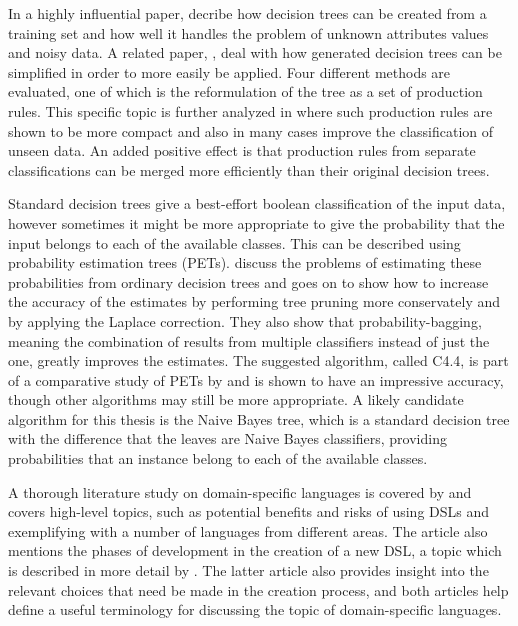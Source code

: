 \documentclass[10pt,twocolumn]{article}
\begin{document}
In a highly influential paper, \citet{Quinlan1986} decribe how decision trees can be created from a training set and how well it handles the problem of unknown attributes values and noisy data. A related paper, \citet{Quinlan1987}, deal with how generated decision trees can be simplified in order to more easily be applied. Four different methods are evaluated, one of which is the reformulation of the tree as a set of production rules. This specific topic is further analyzed in \citet{Quinlan1987b} where such production rules are shown to be more compact and also in many cases improve the classification of unseen data. An added positive effect is that production rules from separate classifications can be merged more efficiently than their original decision trees.

Standard decision trees give a best-effort boolean classification of the input data, however sometimes it might be more appropriate to give the probability that the input belongs to each of the available classes. This can be described using probability estimation trees (PETs). \citet{Provost2003} discuss the problems of estimating these probabilities from ordinary decision trees and goes on to show how to increase the accuracy of the estimates by performing tree pruning more conservately and by applying the Laplace correction. They also show that probability-bagging, meaning the combination of results from multiple classifiers instead of just the one, greatly improves the estimates. The suggested algorithm, called C4.4, is part of a comparative study of PETs by \citet{Chu2011} and is shown to have an impressive accuracy, though other algorithms may still be more appropriate. A likely candidate algorithm for this thesis is the Naive Bayes tree, which is a standard decision tree with the difference that the leaves are Naive Bayes classifiers, providing probabilities that an instance belong to each of the available classes.

A thorough literature study on domain-specific languages is covered by \citet{Deursen2000} and covers high-level topics, such as potential benefits and risks of using DSLs and exemplifying with a number of languages from different areas. The article also mentions the phases of development in the creation of a new DSL, a topic which is described in more detail by \citet{Mernik2005}. The latter article also provides insight into the relevant choices that need be made in the creation process, and both articles help define a useful terminology for discussing the topic of domain-specific languages.
\end{document}
